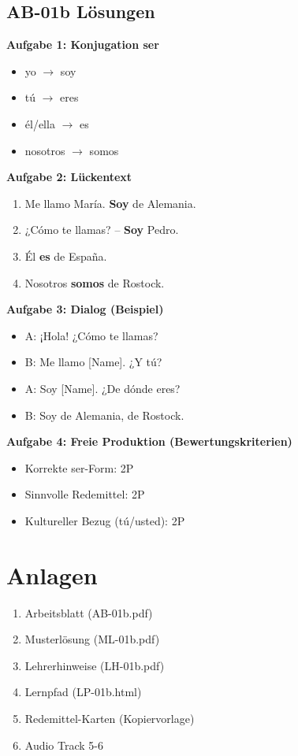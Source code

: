 \documentclass[11pt,a4paper]{article}
\begin{document}
\subsection{AB-01b Lösungen}

\textbf{Aufgabe 1: Konjugation ser}
\begin{itemize}
    \item yo $\rightarrow$ soy
    \item tú $\rightarrow$ eres
    \item él/ella $\rightarrow$ es
    \item nosotros $\rightarrow$ somos
\end{itemize}

\textbf{Aufgabe 2: Lückentext}
\begin{enumerate}[label=\alph*)]
    \item Me llamo María. \textbf{Soy} de Alemania.
    \item ¿Cómo te llamas? -- \textbf{Soy} Pedro.
    \item Él \textbf{es} de España.
    \item Nosotros \textbf{somos} de Rostock.
\end{enumerate}

\textbf{Aufgabe 3: Dialog (Beispiel)}
\begin{itemize}
    \item A: ¡Hola! ¿Cómo te llamas?
    \item B: Me llamo [Name]. ¿Y tú?
    \item A: Soy [Name]. ¿De dónde eres?
    \item B: Soy de Alemania, de Rostock.
\end{itemize}

\textbf{Aufgabe 4: Freie Produktion (Bewertungskriterien)}
\begin{itemize}
    \item Korrekte ser-Form: 2P
    \item Sinnvolle Redemittel: 2P
    \item Kultureller Bezug (tú/usted): 2P
\end{itemize}

\section{Anlagen}

\begin{enumerate}
    \item Arbeitsblatt (AB-01b.pdf)
    \item Musterlösung (ML-01b.pdf)
    \item Lehrerhinweise (LH-01b.pdf)
    \item Lernpfad (LP-01b.html)
    \item Redemittel-Karten (Kopiervorlage)
    \item Audio Track 5-6
\end{enumerate}
\end{document}
